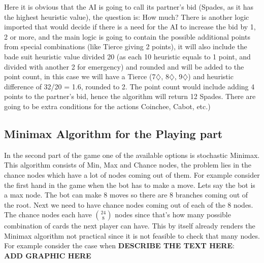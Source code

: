 Here it is obvious that the AI
is going to call its partner’s bid (Spades, as it has the highest heuristic value), the question is: How much? There is another logic
imported that would decide if there is a need for the AI to increase the bid by 1, 2 or
more, and the main logic is going to contain the possible additional points from special
combinations (like Tierce giving 2 points), it will also include the bade suit heuristic
value divided 20 (as each 10 heuristic equals to 1 point, and divided with another 2 for emergency)
and rounded and will be added to the point
count, in this case we will have a Tierce (7$\diamondsuit$, 8$\diamondsuit$, 9$\diamondsuit$) and heuristic difference of 32/20
= 1.6, rounded to 2. The point count would include adding 4 points to the partner’s bid,
hence the algorithm will return 12 Spades. There are going to be extra conditions for
the actions Coinchee, Cabot, etc.)


\subsection{Minimax Algorithm for the Playing part}
\hspace{\parindent} In the second part of the game one of the available options is stochastic Minimax.
This algorithm consists of Min, Max and Chance nodes, the problem lies in the chance nodes which have a lot of nodes coming out of them.
For example consider the first hand in the game when the bot has to make a move. Lets say the bot is a max node.
The bot can make 8 moves so there are 8 branches coming out of the root. Next we need to have chance nodes coming out of each of the 8 nodes.
The chance nodes each have $\binom{24}{8}$ nodes since that's how many possible combination of cards the next player can have.
This by itself already renders the Minimax algorithm not practical since it is not feasible to check that many nodes.
For example consider the case when \textbf{DESCRIBE THE TEXT HERE}: \\
\textbf{ADD GRAPHIC HERE}